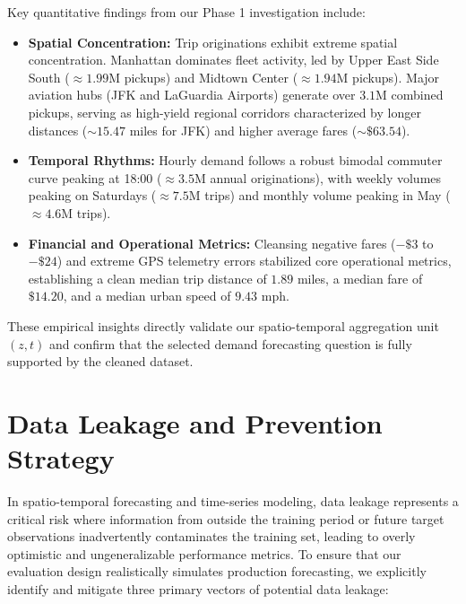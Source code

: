 \documentclass[11pt,a4paper]{article}
\begin{document}
Key quantitative findings from our Phase 1 investigation include:
\begin{itemize}
    \item \textbf{Spatial Concentration:} Trip originations exhibit extreme spatial concentration. Manhattan dominates fleet activity, led by Upper East Side South ($\approx 1.99\text{M}$ pickups) and Midtown Center ($\approx 1.94\text{M}$ pickups). Major aviation hubs (JFK and LaGuardia Airports) generate over $3.1\text{M}$ combined pickups, serving as high-yield regional corridors characterized by longer distances ($\sim 15.47$ miles for JFK) and higher average fares ($\sim \$63.54$).
    \item \textbf{Temporal Rhythms:} Hourly demand follows a robust bimodal commuter curve peaking at 18:00 ($\approx 3.5\text{M}$ annual originations), with weekly volumes peaking on Saturdays ($\approx 7.5\text{M}$ trips) and monthly volume peaking in May ($\approx 4.6\text{M}$ trips).
    \item \textbf{Financial and Operational Metrics:} Cleansing negative fares ($-\$3$ to $-\$24$) and extreme GPS telemetry errors stabilized core operational metrics, establishing a clean median trip distance of $1.89$ miles, a median fare of $\$14.20$, and a median urban speed of $9.43$ mph.
\end{itemize}
These empirical insights directly validate our spatio-temporal aggregation unit $(z,t)$ and confirm that the selected demand forecasting question is fully supported by the cleaned dataset.

\section{Data Leakage and Prevention Strategy}
In spatio-temporal forecasting and time-series modeling, data leakage represents a critical risk where information from outside the training period or future target observations inadvertently contaminates the training set, leading to overly optimistic and ungeneralizable performance metrics. To ensure that our evaluation design realistically simulates production forecasting, we explicitly identify and mitigate three primary vectors of potential data leakage:
\end{document}
